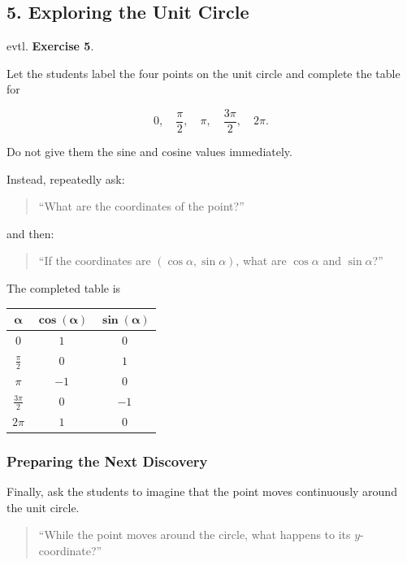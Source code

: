 \documentclass[a4paper,11pt]{article}
\begin{document}
\subsection*{5. Exploring the Unit Circle}

evtl.  \textbf{Exercise 5}.

Let the students label the four points on the unit circle and complete
the table for

\begin{equation}
    0,\quad
    \frac{\pi}{2},\quad
    \pi,\quad
    \frac{3\pi}{2},\quad
    2\pi.
\end{equation}

Do not give them the sine and cosine values immediately.

Instead, repeatedly ask:

\begin{quote}
    ``What are the coordinates of the point?''
\end{quote}

and then:

\begin{quote}
    ``If the coordinates are $(\cos\alpha,\sin\alpha)$,
    what are $\cos\alpha$ and $\sin\alpha$?''
\end{quote}

The completed table is

\begin{center}
\begin{tabular}{c|c|c}
    $\boldsymbol{\alpha}$ &
    $\boldsymbol{\cos(\alpha)}$ &
    $\boldsymbol{\sin(\alpha)}$ \\ \hline
    $0$              & $1$  & $0$  \\
    $\frac{\pi}{2}$  & $0$  & $1$  \\
    $\pi$             & $-1$ & $0$  \\
    $\frac{3\pi}{2}$ & $0$  & $-1$ \\
    $2\pi$            & $1$  & $0$
\end{tabular}
\end{center}


\subsubsection*{Preparing the Next Discovery}

Finally, ask the students to imagine that the point moves continuously
around the unit circle.

\begin{quote}
    ``While the point moves around the circle, what happens to its
    $y$-coordinate?''
\end{quote}
\end{document}
